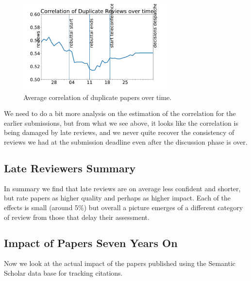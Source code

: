 \begin{figure}[htb]
\includegraphics[width=0.70\textwidth]{diagrams/neurips/correlation-duplicate-reviews.pdf}


\caption{Average correlation of duplicate papers over time.}
\label{correlation-duplicate-reviews}
\end{figure}

We need to do a bit more analysis on the estimation of the correlation
for the earlier submissions, but from what we see above, it looks like
the correlation is being damaged by late reviews, and we never quite
recover the consistency of reviews we had at the submission deadline
even after the discussion phase is over.

\hypertarget{late-reviewers-summary}{%
\subsection{Late Reviewers Summary}\label{late-reviewers-summary}}

In summary we find that late reviews are on average less confident and
shorter, but rate papers as higher quality and perhaps as higher impact.
Each of the effects is small (around 5\%) but overall a picture emerges
of a different category of review from those that delay their
assessment.

\hypertarget{impact-of-papers-seven-years-on}{%
\subsection{Impact of Papers Seven Years
On}\label{impact-of-papers-seven-years-on}}

\begin{flushright}
\end{flushright}

Now we look at the actual impact of the papers published using the
Semantic Scholar data base for tracking citations.

